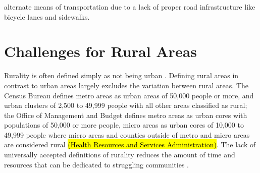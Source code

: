 alternate means of transportation due to a lack of proper road infrastructure like bicycle lanes and sidewalks.

\section{Challenges for Rural Areas}

 Rurality is often defined simply as not being urban \citep{robertson_rural_2007}. Defining rural areas in contrast to urban areas largely excludes the variation between rural areas. The Census Bureau defines metro areas as urban areas of 50,000 people or more, and urban clusters of 2,500 to 49,999 people with all other areas classified as rural; the Office of Management and Budget defines metro areas as urban cores with populations of 50,000 or more people, micro areas as urban cores of 10,000 to 49,999 people where micro areas and counties outside of metro and micro areas are considered rural \hl{(Health Resources and Services Administration)}. %
 The lack of universally accepted definitions of rurality reduces the amount of time and resources that can be dedicated to struggling communities \citep{yousey_defining_2018}. 
 
